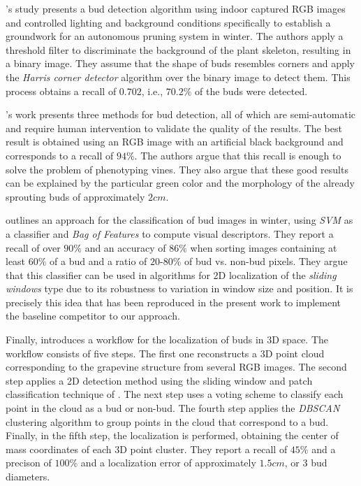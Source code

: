\documentclass[a4paper,authoryear,review]{elsarticle}
\begin{document}
	\citet{xu2014detection}’s study presents a bud detection algorithm using indoor captured RGB images and controlled lighting and background conditions specifically to establish a groundwork for an autonomous pruning system in winter. The authors apply a threshold filter to discriminate the background of the plant skeleton, resulting in a binary image. They assume that the shape of buds resembles corners and apply the \emph{Harris corner detector} algorithm over the binary image to detect them. This process obtains a recall of $0.702$, i.e., $70.2\%$ of the buds were detected. 
	
	\citet{herzog2014initial}’s work presents three methods for bud detection, all of which are semi-automatic and require human intervention to validate the quality of the results. The best result is obtained using an RGB image with an artificial black background and corresponds to a recall of $94\%$. The authors argue that this recall is enough to solve the problem of phenotyping vines. They also argue that these good results can be explained by the particular green color and the morphology of the already sprouting buds of approximately $2cm$.  
	
	\citet{perez2017image} outlines an approach for the classification of bud images in winter, using \emph{SVM} as a classifier and \emph{Bag of Features} to compute visual descriptors. They report a recall of over $90\%$ and an accuracy of $86\%$ when sorting images containing at least $60\%$ of a bud and a ratio of $20$-$80\%$ of bud vs. non-bud pixels. They argue that this classifier can be used in algorithms for 2D localization of the \emph{sliding windows} type due to its robustness to variation in window size and position. It is precisely this idea that has been reproduced in the present work to implement the baseline competitor to our approach.
	
	Finally, \citet{diaz2018grapevine} introduces a workflow for the localization of buds in 3D space. The workflow consists of five steps. The first one reconstructs a 3D point cloud corresponding to the grapevine structure from several RGB images. The second step applies a 2D detection method using the sliding window and patch classification technique of \citet{perez2017image}. The next step uses a voting scheme to classify each point in the cloud as a bud or non-bud. The fourth step applies the \emph{DBSCAN} clustering algorithm to group points in the cloud that correspond to a bud. Finally, in the fifth step, the localization is performed, obtaining the center of mass coordinates of each 3D point cluster. They report a recall of $45\%$ and a precison of $100\%$ and a localization error of approximately $1.5cm$, or 3 bud diameters.  
	
\end{document}
